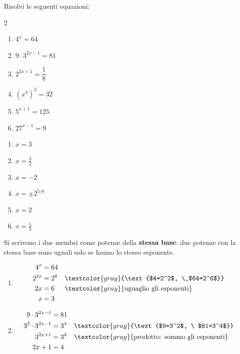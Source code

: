 \begin{question}[ID=1.3, subtitle={Equazioni risolte con le proprietà delle potenze}, tags={potenze, equazioni}, difficulty=media]
Risolvi le seguenti equazioni:
\begin{multicols}{2}
\begin{enumerate}[leftmargin=3.2cm]
    \item $4^{x}=64$
    \item $9\cdot 3^{2x-1}=81$
    \item $2^{2x+1}= \dfrac{1}{8}$
    \item $(x^{3})^{2}= 32$
    \item $5^{x+1}=125$
    \item $27^{x-1}=9$
\end{enumerate}
\end{multicols}
\begin{solution}
\begin{enumerate}
    \item $x=3$
    \item $x=\tfrac32$
    \item $x=-2$
    \item $x=\pm2^{5/6}$
    \item $x=2$
    \item $x=\tfrac53$
\end{enumerate}
\end{solution}
\begin{explanation}
Si scrivono i due membri come potenze della \textbf{stessa base}: due potenze con la stessa base sono uguali solo se hanno lo stesso esponente.
\begin{enumerate}
    \item \[\begin{aligned}
    4^x &= 64\\
    2^{2x} &= 2^6 && \textcolor{gray}{\text{$4=2^2$, \ $64=2^6$}}\\
    2x &= 6 && \textcolor{gray}{\text{uguaglio gli esponenti}}\\
    x &= 3
    \end{aligned}\]
    \item \[\begin{aligned}
    9\cdot3^{2x-1} &= 81\\
    3^2\cdot3^{2x-1} &= 3^4 && \textcolor{gray}{\text{$9=3^2$, \ $81=3^4$}}\\
    3^{2x+1} &= 3^4 && \textcolor{gray}{\text{prodotto: sommo gli esponenti}}\\
    2x+1 &= 4\\

\end{aligned}\]
\end{enumerate}
\end{explanation}
\end{question}
